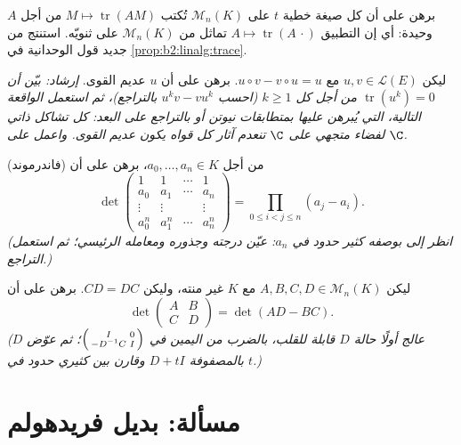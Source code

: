 \begin{exercise}[$\star\star\star$]\label{exo:b2:linalg:9}
برهن على أن كل صيغة خطية $t$ على $\mathcal{M}_n(K)$ تُكتب $M \mapsto
\operatorname{tr}(AM)$ من أجل $A$ وحيدة: أي إن التطبيق $A \mapsto
\operatorname{tr}(A\,\cdot)$ تماثل من
$\mathcal{M}_n(K)$ على ثنويّه. استنتج من جديد قول الوحدانية في
\cref{prop:b2:linalg:trace}.
\end{exercise}

\begin{exercise}[$\star\star\star$]\label{exo:b2:linalg:10}
ليكن $u, v \in \mathcal{L}(E)$ مع $u \circ v - v \circ u = u$.
برهن على أن $u$ عديم القوى. \emph{إرشاد: بيّن أن
$\operatorname{tr}(u^k) = 0$ من أجل كل $k \geq 1$ (احسب $u^k v -
v u^k$ بالتراجع)، ثم استعمل الواقعة التالية، التي يُبرهن عليها
بمتطابقات نيوتن أو بالتراجع على البعد: كل تشاكل ذاتي
لفضاء متجهي على $\C$ تنعدم آثار كل قواه يكون عديم القوى.
واعمل على $\C$.}
\end{exercise}

\begin{exercise}[$\star\star$]\label{exo:b2:linalg:11}
(فاندرموند) من أجل $a_0, \dots, a_n \in K$، برهن على أن
\[
\det\begin{pmatrix}
1 & 1 & \cdots & 1\\
a_0 & a_1 & \cdots & a_n\\
\vdots & \vdots & & \vdots\\
a_0^n & a_1^n & \cdots & a_n^n
\end{pmatrix}
= \prod_{0 \leq i < j \leq n} (a_j - a_i).
\]
\emph{(انظر إلى  بوصفه كثير حدود في $a_n$: عيّن
درجته وجذوره ومعامله الرئيسي؛ ثم استعمل التراجع.)}
\end{exercise}

\begin{exercise}[$\star\star\star$]\label{exo:b2:linalg:12}
ليكن $A, B, C, D \in \mathcal{M}_n(K)$ مع $K$ غير منته، وليكن
$CD = DC$. برهن على أن
\[
\det\begin{pmatrix} A & B\\ C & D\end{pmatrix}
= \det(AD - BC).
\]
\emph{(عالج أولًا حالة $D$ قابلة للقلب، بالضرب من اليمين في
$\begin{psmallmatrix} I & 0\\ -D^{-1}C & I\end{psmallmatrix}$؛ ثم عوّض $D$ بالمصفوفة $D + tI$ وقارن بين كثيري حدود في $t$.)}
\end{exercise}

\section{مسألة: بديل فريدهولم}

